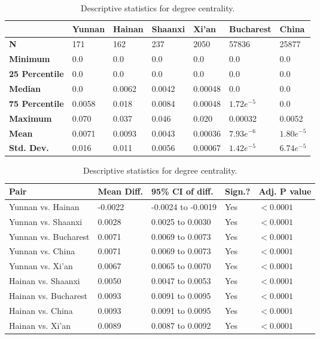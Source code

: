 \begin{table}[h]
	\begin{mdframed}
		\begin{tabular*}{\linewidth}{l|llllll}
			\hline
			\textbf{ } & \textbf{Yunnan} & \textbf{Hainan} & \textbf{Shaanxi} & \textbf{Xi'an} & \textbf{Bucharest} & \textbf{China}\\
			\hline
			\textbf{N} & 171 & 162 & 237 & 2050 & 57836 & 25877\\
			\textbf{Minimum} & 0.0 & 0.0 & 0.0 & 0.0 & 0.0 & 0.0\\
			\textbf{25 Percentile} & 0.0 & 0.0 & 0.0 & 0.0 & 0.0 & 0.0\\
			\textbf{Median} & 0.0 & 0.0062 & 0.0042 & 0.00048 & 0.0 & 0.0\\
			\textbf{75 Percentile} & 0.0058 & 0.018 & 0.0084 & 0.00048 & $1.72e^{-5}$ & 0.0\\
			\textbf{Maximum} & 0.070 & 0.037 & 0.046 & 0.020 & 0.00032 & 0.0052\\
			\textbf{Mean} & 0.0071 & 0.0093 & 0.0043 & 0.00036 & $7.93e^{-6}$ & $1.80e^{-5}$\\
			\textbf{Std. Dev.} & 0.016 & 0.011 & 0.0056 & 0.00067 & $1.42e^{-5}$ & $6.74e^{-5}$\\
			\hline
		\end{tabular*}
		\caption{Descriptive statistics for degree centrality.}
		\label{tab:degree_centrality_desc}
		\vskip 10pt
		\small
		\begin{tabular*}{\linewidth}{l|llll}
			\hline
			\textbf{Pair} & \textbf{Mean Diff.} & \textbf{95\% CI of diff.} & \textbf{Sign.?} & \textbf{Adj. P value}\\
			\hline
			Yunnan vs. Hainan & -0.0022 & -0.0024 to -0.0019 & Yes & $<0.0001$\\
			Yunnan vs. Shaanxi & 0.0028 & 0.0025 to 0.0030 & Yes & $<0.0001$\\
			Yunnan vs. Bucharest & 0.0071 & 0.0069 to 0.0073 & Yes & $<0.0001$\\
			Yunnan vs. China & 0.0071 & 0.0069 to 0.0073 & Yes & $<0.0001$\\
			Yunnan vs. Xi'an & 0.0067 & 0.0065 to 0.0070 & Yes & $<0.0001$\\
			Hainan vs. Shaanxi & 0.0050 & 0.0047 to 0.0053 & Yes & $<0.0001$\\
			Hainan vs. Bucharest & 0.0093 & 0.0091 to 0.0095 & Yes & $<0.0001$\\
			Hainan vs. China & 0.0093 & 0.0091 to 0.0095 & Yes & $<0.0001$\\
			Hainan vs. Xi'an & 0.0089 & 0.0087 to 0.0092 & Yes & $<0.0001$\\

\end{tabular*}
\end{mdframed}
\end{table}
